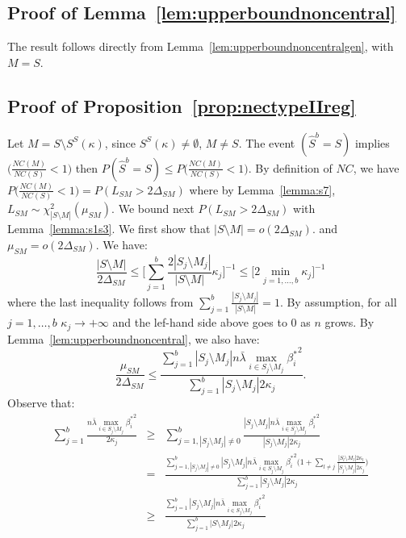 \documentclass[aos]{imsart}
\theoremstyle{plain}
\begin{document}
\subsection{Proof of Lemma~\ref{lem:upperboundnoncentral}}
The result follows directly from Lemma~\ref{lem:upperboundnoncentralgen}, with $M=S$.

\subsection{Proof of Proposition~\ref{prop:nectypeIIreg}}

Let $M=S\setminus S^{S}(\kappa)$, since $S^{S}(\kappa)\neq \emptyset$, $M\neq S$. The event $(\hat{S}^b=S)$ implies $\big(\frac{NC(M)}{NC(S)}<1\big)$ then $P(\hat{S}^b=S)\leq P\big(\frac{NC(M)}{NC(S)}<1\big)$. By definition of $NC$, we have
$P\big(\frac{NC(M)}{NC(S)}<1\big) = P(L_{SM}> 2\Delta_{SM})$ where by Lemma~\ref{lemma:s7},  $L_{SM}\sim \chi_{|S\setminus M|}^2(\mu_{SM})$. We  bound next $P(L_{SM}> 2\Delta_{SM})$ with Lemma~\ref{lemma:s1s3}. We first show that $|S\setminus M|=o(2\Delta_{SM})$. and $\mu_{SM}=o(2\Delta_{SM})$. We have:
$$\frac{|S\setminus M|}{2\Delta_{SM}}\leq \bigg[\sum_{j=1}^b\frac{2|S_j \setminus M_j|}{|S\setminus M|}\kappa_j \bigg]^{-1} \leq \Big[ 2\min_{j=1,\ldots,b}\kappa_j \Big]^{-1} $$
where the last inequality follows from $\sum_{j=1}^b\frac{|S_j \setminus M_j|}{|S\setminus M|}=1$. By assumption, for all $j=1,\ldots,b$ $\kappa_j\to +\infty$ and the lef-hand side above goes to 0 as $n$ grows. By Lemma~\ref{lem:upperboundnoncentral}, we also have:
$$\frac{\mu_{SM}}{2\Delta_{SM}}\leq \frac{ \sum_{j=1}^b |S_j\setminus M_j|n\bar{\lambda}\max_{i\in S_j\setminus M_j}{\beta_i^*}^2}{\sum_{j=1}^b |S_j\setminus M_j|2 \kappa_j}.$$
Observe that:
\begin{eqnarray*}
    \sum_{j=1}^b\frac{n\bar{\lambda}\max_{i\in S_j\setminus M_j}{\beta_i^*}^2}{2\kappa_j}
    &\geq &\sum_{j=1,|S_j\setminus M_j|\neq 0}^b\frac{|S_j\setminus M_j|n\bar{\lambda}\max_{i\in S_j\setminus M_j}{\beta_i^*}^2}{|S_j\setminus M_j|2\kappa_j} \\
    &=& \frac{\sum_{j=1,|S_j\setminus M_j|\neq 0 }^b|S_j\setminus M_j|n\bar{\lambda}\max_{i\in S_j\setminus M_j}{\beta_i^*}^2\Big(1+\sum_{l\neq j}\frac{|S_l\setminus M_l|2\kappa_l}{|S_j\setminus M_j|2\kappa_j}\Big)}{\sum_{j=1}^b|S_j\setminus M_j|2\kappa_j} \\
    &\geq & \frac{\sum_{j=1}^b|S_j\setminus M_j|n\bar{\lambda}\max_{i\in S_j\setminus M_j}{\beta_i^*}^2}{\sum_{j=1}^b \big|S\setminus M_j\big|2\kappa_j}
\end{eqnarray*}
\end{document}
